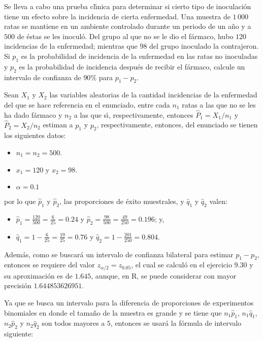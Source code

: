 \begin{enunciado}
 Se lleva a cabo una prueba cl\'{\i}nica para determinar si cierto tipo de inoculaci\'on tiene un efecto sobre la incidencia de cierta enfermedad. Una muestra de $1\,000$ ratas se mantiene en un ambiente controlado durante un periodo de un a\~no y a $500$ de \'estas se les inocul\'o. Del grupo al que no se le dio el f\'armaco, hubo $120$ incidencias de la enfermedad; mientras que $98$ del grupo inoculado la contrajeron. Si $p_1$ es la probabilidad de incidencia de la enfermedad en las ratas no inoculadas y $p_2$ es la probabilidad de incidencia despu\'es de recibir el f\'armaco, calcule un intervalo de confianza de $90\%$ para $p_1 - p_2$.
\end{enunciado}

\begin{solucion}
 Sean $X_1$ y $X_2$ las variables aleatorias de la cantidad incidencias de la enfermedad del que se hace referencia en el enunciado, entre cada $n_1$ ratas a las que no se les ha dado f\'armaco y $n_2$ a las que s\'{\i}, respectivamente, entonces $\widehat{P}_1 = X_1/n_1$ y $\widehat{P}_2 = X_2/n_2$ estiman a $p_1$ y $p_2$, respectivamente, entonces, del enunciado se tienen los siguientes datos:
 \begin{itemize}
  \item $n_1 = n_2 = 500$.
  \item $x_1 = 120$ y $x_2 = 98$.
  \item $\alpha = 0.1$
 \end{itemize}
 por lo que $\hat{p}_1$ y $\hat{p}_2$, las proporciones de \'exito muestrales, y $\hat{q}_1$ y $\hat{q}_2$ valen:
 \begin{itemize}
  \item $\hat{p}_1 = \frac{120}{500} = \frac{6}{25} = 0.24$ y $\hat{p}_2 = \frac{98}{500} = \frac{49}{250} = 0.196$; y,
  \item $\hat{q}_1 = 1 - \frac{6}{25} = \frac{19}{25} = 0.76$ y $\hat{q}_2 = 1 - \frac{201}{250} = 0.804$.
 \end{itemize}
 Adem\'as, como se buscar\'a un intervalo de confianza bilateral para estimar $p_1 - p_2$, entonces se requiere del valor $z_{\alpha/2} = z_{0.05}$, el cual se calcul\'o en el ejercicio 9.30 y su aproximaci\'on es de $1.645$, aunque, en R, se puede considerar con mayor precisi\'on $1.644853626951$.
 \par 
 Ya que se busca un intervalo para la diferencia de proporciones de experimentos binomiales en donde el tama\~no de la muestra es grande y se tiene que $n_1\hat{p}_1$, $n_1\hat{q}_1$, $n_2\hat{p}_2$ y $n_2\hat{q}_2$ son todos mayores a $5$, entonces se usar\'a la f\'ormula de intervalo siguiente:

\end{solucion}
